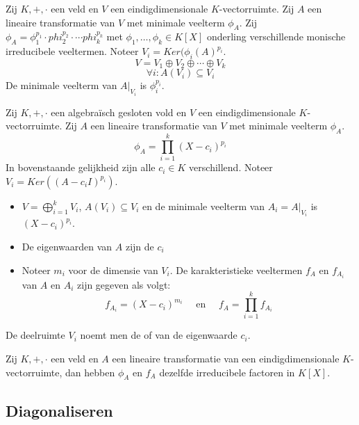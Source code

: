 \documentclass[main.tex]{subfiles}
\begin{document}
\begin{gev}
  Zij $K,+,\cdot$ een veld en $V$ een eindigdimensionale $K$-vectorruimte.
  Zij $A$ een lineaire transformatie van $V$ met minimale veelterm $\phi_{A}$.
  Zij $\phi_{A} = \phi_{1}^{p_{1}}\cdot phi_{2}^{p_{2}}\cdot \dotsb phi_{k}^{p_{k}}$ met $\phi_{1},\dotsc,\phi_{k}\in K[X]$ onderling verschillende monische irreducibele veeltermen.
  Noteer $V_{i} = Ker(\phi_{i}(A)^{p_{i}}$.
  \[ V = V_{1} \oplus V_{2} \oplus \dotsb \oplus V_{k} \]
  \[ \forall i: A(V_{i}) \subseteq V_{i} \]
  De minimale veelterm van $A|_{V_{i}}$ is $\phi_{i}^{p_{i}}$.
\end{gev}

\begin{st}
  Zij $K,+,\cdot$ een algebra\"isch gesloten vold en $V$ een eindigdimensionale $K$-vectorruimte.
  Zij $A$ een lineaire transformatie van $V$ met minimale veelterm $\phi_{A}$.
  \[ \phi_{A} = \prod_{i=1}^{k}(X-c_{i})^{p_{i}} \]
  In bovenstaande gelijkheid zijn alle $c_{i} \in K$ verschillend.
  Noteer $V_{i}=Ker((A-c_{i}I)^{p_{i}})$.
  \begin{itemize}
  \item $V = \bigoplus_{i=1}^{k}V_{i}$, $A(V_{i}) \subseteq V_{i}$ en de minimale veelterm van $A_{i} = A|_{V_{i}}$ is $(X-c_{i})^{p_{i}}$.
  \item De eigenwaarden van $A$ zijn de $c_{i}$
  \item Noteer $m_{i}$ voor de dimensie van $V_{i}$.
    De karakteristieke veeltermen $f_{A}$ en $f_{A_{i}}$ van $A$ en $A_{i}$ zijn gegeven als volgt:
    \[ f_{A_{i}} = (X-c_{i})^{m_{i}} \quad\text{ en }\quad f_{A} = \prod_{i=1}^{k}f_{A_{i}} \]
  \end{itemize}
\end{st}

\begin{de}
  De deelruimte $V_{i}$ noemt men de  of  van de eigenwaarde $c_{i}$.
\end{de}

\begin{ei}
  Zij $K,+,\cdot$ een veld en $A$ een lineaire transformatie van een eindigdimensionale $K$-vectorruimte, dan hebben $\phi_{A}$ en $f_{A}$ dezelfde irreducibele factoren in $K[X]$.
\end{ei}

\subsection{Diagonaliseren}
\label{sec:diagonaliseren}
\end{document}

